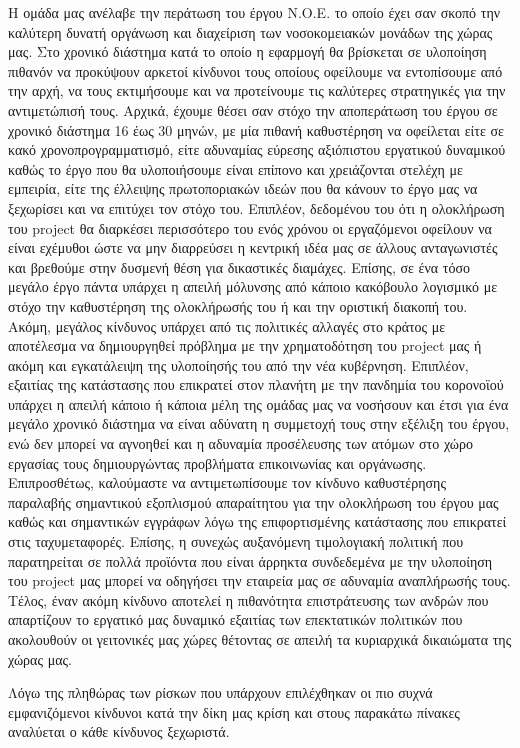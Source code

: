 \documentclass[12pt,a4paper,oneside]{article}
\begin{document}
\hspace{1cm}Η ομάδα μας ανέλαβε την περάτωση του έργου Ν.Ο.Ε. το οποίο έχει σαν σκοπό την καλύτερη δυνατή οργάνωση και διαχείριση των νοσοκομειακών μονάδων της χώρας μας. Στο χρονικό διάστημα κατά το οποίο η εφαρμογή θα βρίσκεται σε υλοποίηση πιθανόν να προκύψουν αρκετοί κίνδυνοι τους οποίους οφείλουμε να εντοπίσουμε από την αρχή, να τους εκτιμήσουμε και να προτείνουμε τις καλύτερες στρατηγικές για την αντιμετώπισή τους. Αρχικά, έχουμε θέσει σαν στόχο την αποπεράτωση του έργου σε χρονικό διάστημα 16 έως 30 μηνών, με μία πιθανή καθυστέρηση να οφείλεται είτε σε κακό χρονοπρογραμματισμό, είτε αδυναμίας εύρεσης αξιόπιστου εργατικού δυναμικού καθώς το έργο που θα υλοποιήσουμε είναι επίπονο και χρειάζονται στελέχη με εμπειρία, είτε της έλλειψης πρωτοποριακών ιδεών που θα κάνουν το έργο μας να ξεχωρίσει και να επιτύχει τον στόχο του. Επιπλέον, δεδομένου του ότι η ολοκλήρωση του project θα διαρκέσει περισσότερο του ενός χρόνου οι εργαζόμενοι οφείλουν να είναι εχέμυθοι ώστε να μην διαρρεύσει η κεντρική ιδέα μας σε άλλους ανταγωνιστές και βρεθούμε στην δυσμενή θέση για δικαστικές διαμάχες. Επίσης, σε ένα τόσο μεγάλο έργο πάντα υπάρχει η απειλή μόλυνσης από κάποιο κακόβουλο λογισμικό με στόχο την καθυστέρηση της ολοκλήρωσής του ή και την οριστική διακοπή του. Ακόμη, μεγάλος κίνδυνος υπάρχει από τις πολιτικές αλλαγές στο κράτος με αποτέλεσμα να δημιουργηθεί πρόβλημα με την χρηματοδότηση του project μας ή ακόμη και εγκατάλειψη της υλοποίησής του από την νέα κυβέρνηση. Επιπλέον, εξαιτίας της κατάστασης που επικρατεί στον πλανήτη με την πανδημία του κορονοϊού υπάρχει η απειλή κάποιο ή κάποια μέλη της ομάδας μας να νοσήσουν και έτσι για ένα μεγάλο χρονικό διάστημα να είναι αδύνατη η συμμετοχή τους στην εξέλιξη του έργου, ενώ δεν μπορεί να αγνοηθεί και η αδυναμία προσέλευσης των ατόμων στο χώρο εργασίας τους δημιουργώντας προβλήματα επικοινωνίας και οργάνωσης. Επιπροσθέτως, καλούμαστε να αντιμετωπίσουμε τον κίνδυνο καθυστέρησης παραλαβής σημαντικού εξοπλισμού απαραίτητου για την ολοκλήρωση του έργου μας καθώς και σημαντικών εγγράφων λόγω της επιφορτισμένης κατάστασης που επικρατεί στις ταχυμεταφορές. Επίσης, η συνεχώς αυξανόμενη τιμολογιακή πολιτική που παρατηρείται σε πολλά προϊόντα που είναι άρρηκτα συνδεδεμένα με την υλοποίηση του project μας μπορεί να οδηγήσει την εταιρεία μας σε αδυναμία αναπλήρωσής τους. Τέλος, έναν ακόμη κίνδυνο αποτελεί η πιθανότητα επιστράτευσης των ανδρών που απαρτίζουν το εργατικό μας δυναμικό εξαιτίας των επεκτατικών πολιτικών που ακολουθούν οι γειτονικές μας χώρες θέτοντας σε απειλή τα κυριαρχικά δικαιώματα της χώρας μας.\par
Λόγω της πληθώρας των ρίσκων που υπάρχουν επιλέχθηκαν οι πιο συχνά εμφανιζόμενοι κίνδυνοι κατά την δίκη μας κρίση και στους παρακάτω πίνακες αναλύεται ο κάθε κίνδυνος ξεχωριστά.
\end{document}
